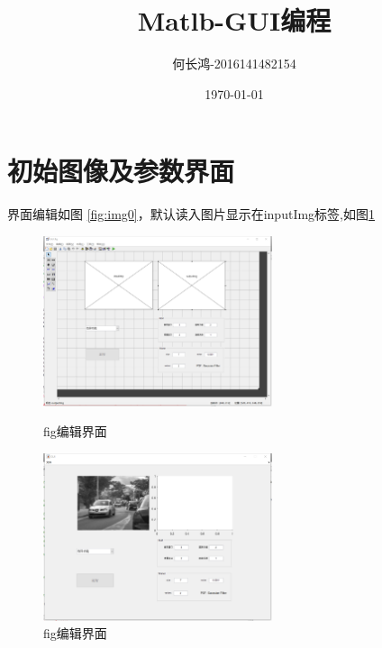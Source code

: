 \documentclass[lang=cn]{elegantpaper}
\title{Matlb-GUI编程}
\author{何长鸿-2016141482154}
\date{\today}
\begin{document}
\maketitle

\section{初始图像及参数界面}
\par 界面编辑如图 \ref{fig:img0}，默认读入图片显示在inputImg标签,如图\ref{fig:img1}
    \begin{figure}[htbp]
        \centering
        \includegraphics[width=0.6\textwidth]{img0.png}
        \caption{fig编辑界面\label{fig:img0}}
        
        \includegraphics[width=0.6\textwidth]{img1.png}
        \caption{fig编辑界面\label{fig:img1}}
    \end{figure}
\end{document}

